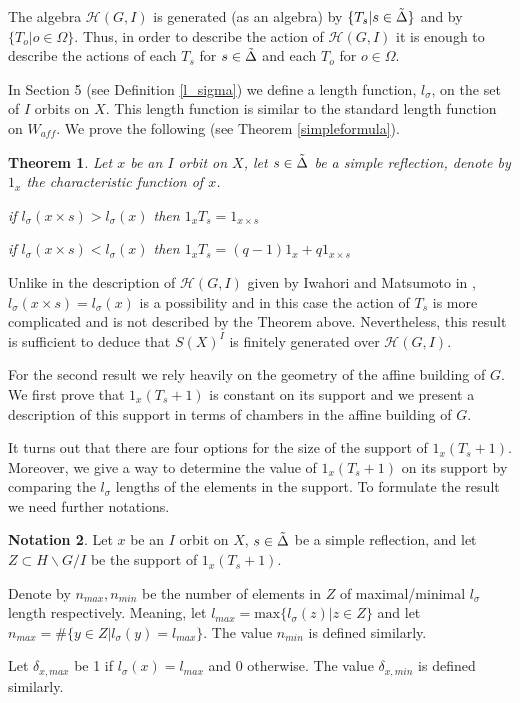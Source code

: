 \documentclass[12pt]{article}
\newcommand{\<}{\langle}
\renewcommand{\>}{\rangle}
\theoremstyle{plain}
\newtheorem{theorem}{Theorem}[section] %
\theoremstyle{definition}
\newtheorem{Not}[theorem]{Notation}
\begin{document}
The algebra $\mathcal{H}(G,I)$ is generated (as an algebra) by $\{T_s|s\in\Tilde{\Delta}\}$ and by $\{T_o|o\in\Omega\}$. Thus, in order to describe the action of $\mathcal{H}(G,I)$ it is enough to describe the actions of each $T_s$ for $s\in \Tilde{\Delta}$ and each $T_o$ for $o\in \Omega$.

In Section 5 (see Definition \ref{l_sigma}) we define a length function, $l_\sigma$, on the set of $I$ orbits on $X$. This length function is similar to the standard length function on $W_{aff}$. We prove the following  (see Theorem \ref{simpleformula}).

\begin{theorem}\label{1.3}
Let $x$ be an $I$ orbit on $X$, let $s\in \Tilde{\Delta}$ be a simple reflection, denote by $1_x$ the characteristic function of $x$.

\item if $l_\sigma(x\times s)>l_\sigma(x)$ then $1_xT_s=1_{x\times s}$
    \item if $l_\sigma(x\times s)<l_\sigma(x)$ then $1_xT_s=(q-1)1_x+q1_{x\times s}$
\end{theorem}

Unlike in the description of $\mathcal{H}(G,I)$ given by Iwahori and Matsumoto in \cite{PMIHES_1965__25__5_0}, $l_\sigma(x\times s)=l_\sigma(x)$ is a possibility and in this case the action of $T_s$ is more complicated and is not described by the Theorem above. Nevertheless, this result is sufficient to deduce that $S(X)^I$ is finitely generated over $\mathcal{H}(G,I)$.

For the second result we rely heavily on the geometry of the affine building of $G$.
We first prove that $1_x(T_s+1)$ is constant on its support and we present a description of this support in terms of chambers in the affine building of $G$.

It turns out that there are four options for the size of the support of $1_x(T_s+1)$. 
Moreover, we give a way to determine the value of $1_x(T_s+1)$ on its support by comparing the $l_\sigma$ lengths of the elements in the support.
To formulate the result we need further notations. 
\begin{Not}
Let $x$ be an $I$ orbit on $X$, $s\in \Tilde{\Delta}$ be a simple reflection,  and let $Z \subset H \backslash G/I$ be the support of $1_x(T_s+1)$. 

 Denote by $n_{max},n_{min}$ be the number of elements in $Z$ of maximal/minimal $l_\sigma$ length respectively.
 Meaning, let $l_{max}=\text{max}\{l_\sigma(z)|z\in Z\}$ and let $n_{max}=\#\{y\in Z|l_\sigma(y)=l_{max}\}$. The value $n_{min}$ is defined similarly.
 
 Let $\delta_{x,max}$ be 1 if $l_\sigma(x)=l_{max}$ and $0$ otherwise. The value $\delta_{x,min}$ is defined similarly. 
\end{Not}
\end{document}
